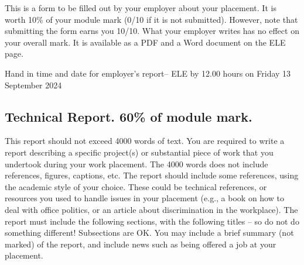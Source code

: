 \documentclass[11pt]{article}
\begin{document}
This is a form to be filled out by your employer about your placement. It is worth 10\% of your module mark (0/10 if it is not submitted). However, note that submitting the form earns you 10/10. What your employer writes has no effect on your overall mark. It is available as a PDF and a Word document on the ELE page.

Hand in time and date for employer’s report– ELE by 12.00 hours on Friday 13 September 2024

\subsection{Technical Report. 60\% of module mark.}
\label{sec:org50b32de}

This report should not exceed 4000 words of text. You are required to write a report describing a specific project(s) or substantial piece of work that you undertook during your work placement. The 4000 words does not include references, figures, captions, etc. The report should include some references, using the academic style of your choice. These could be technical references, or resources you used to handle issues in your placement (e.g., a book on how to deal with office politics, or an article about discrimination in the workplace). The report must include the following sections, with the following titles – so do not do something different! Subsections are OK. You may include a brief summary (not marked) of the report, and include news such as being offered a job at your placement.
\end{document}

